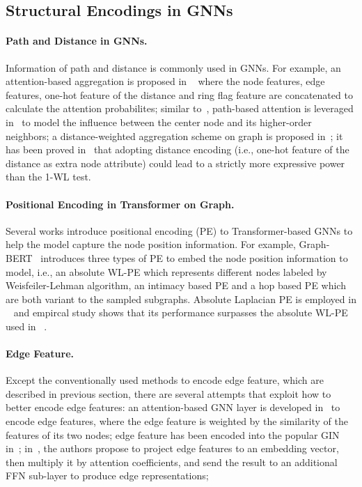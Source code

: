 \documentclass{article}
\begin{document}
\subsection{Structural Encodings in GNNs}
\paragraph{Path and Distance in GNNs.} Information of path and distance is commonly used in GNNs. For example,  an attention-based aggregation is proposed in ~\cite{chen2019path} where the node features, edge features, one-hot feature of the distance and ring flag feature are concatenated to calculate the attention probabilites; similar to~\cite{chen2019path}, path-based attention is leveraged in~\cite{yangspagan} to model the influence between the center node and its higher-order neighbors; a distance-weighted aggregation scheme on graph is proposed in~\cite{you2019position}; it has been proved in~\cite{li2020distance} that  adopting distance encoding (i.e., one-hot feature of the distance as extra node attribute) could lead to a strictly more expressive power than the 1-WL test.

\paragraph{Positional Encoding in Transformer on Graph.} Several works introduce positional encoding (PE) to Transformer-based GNNs to help the model capture the node position information. For example, Graph-BERT~\cite{zhang2020graph} introduces three types of PE to embed the node position information to model, i.e., an absolute WL-PE which represents different nodes labeled by Weisfeiler-Lehman algorithm, an intimacy based PE and a hop based PE which are both variant to the sampled subgraphs. Absolute Laplacian PE is employed in ~\cite{dwivedi2021generalization} and empircal study shows that its performance surpasses the absolute WL-PE used in ~\cite{zhang2020graph}.

\paragraph{Edge Feature.} Except the conventionally used methods to encode edge feature, which are described in previous section, there are several attempts that exploit how to better encode edge features: an attention-based GNN layer is developed in~\cite{gong2019exploiting} to encode edge features, where the edge feature is weighted by the similarity of the features of its two nodes; edge feature has been encoded into the popular GIN~\cite{xu2018how} in~\cite{brossard2020graph}; in~\cite{dwivedi2021generalization}, the authors propose to project edge features to an embedding vector, then multiply it by attention coefficients, and send the result to an additional FFN sub-layer to produce edge representations; 
\end{document}
